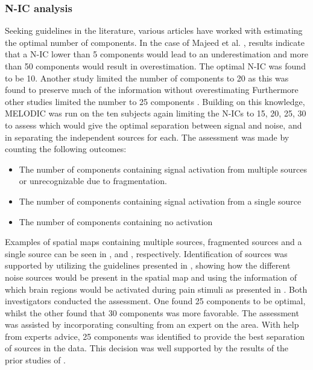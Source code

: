\subsubsection{N-IC analysis}

Seeking guidelines in the literature, various articles have worked with estimating the optimal number of components. In the case of Majeed et al. \cite{Majeed2014}, results indicate that a N-IC lower than 5 components would lead to an underestimation and more than 50 components would result in overestimation. The optimal N-IC was found to be 10. Another study limited the number of components to 20 as this was found to preserve much of the information without overestimating \cite{Calhoun2001} Furthermore other studies limited the number to 25 components \cite{Kim2013,Erpelding2013}. Building on this knowledge, MELODIC was run on the ten subjects again limiting the N-ICs to 15, 20, 25, 30 to assess which would give the optimal separation between signal and noise, and in separating the independent sources for each. The assessment was made by counting the following outcomes: 
\begin{itemize}
	\item The number of components containing signal activation from multiple sources or unrecognizable due to fragmentation. 
	\item The number of components containing signal activation from a single source 
	\item The number of components containing no activation    
\end{itemize}
 
Examples of spatial maps containing multiple sources, fragmented sources and a single source can be seen in ,  and , respectively. Identification of sources was supported by utilizing the guidelines presented in \cite{Griffanti2017}, showing how the different noise sources would be present in the spatial map and using the information of which brain regions would be activated during pain stimuli as presented in . Both investigators conducted the assessment. One found 25 components to be optimal, whilst the other found that 30 components was more favorable. The assessment was assisted by incorporating consulting from an expert on the area. With help from experts advice, 25 components was identified to provide the best separation of sources in the data. This decision was well supported by the results of the prior studies of \cite{Kim2013,Erpelding2013}.     

